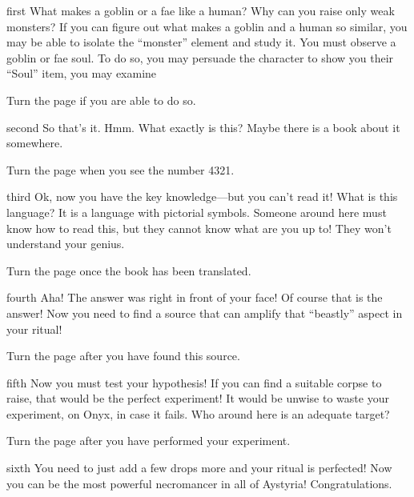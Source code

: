 \documentclass[notebook]{guildcamp2} %
\begin{document}
\startnotebook{\nraisemonster{}}

\begin{page}{first}
What makes a goblin or a fae like a human? Why can you raise only weak monsters? If you can figure out what makes a goblin and a human so similar, you may be able to isolate the ``monster'' element and study it. You must observe a goblin or fae soul. To do so, you may persuade the character to show you their ``Soul'' item, you may examine 

Turn the page if you are able to do so.
\end{page}

\begin{page}{second}
So that's it. Hmm. What exactly is this? Maybe there is a book about it somewhere. 

Turn the page when you see the number 4321.
\end{page}

\begin{page}{third}
Ok, now you have the key knowledge---but you can't read it! What is this language? It is a language with pictorial symbols. Someone around here must know how to read this, but they cannot know what are you up to! They won't understand your genius.

Turn the page once the book has been translated.
\end{page}

\begin{page}{fourth}
Aha! The answer was right in front of your face! Of course that is the answer! Now you need to find a source that can amplify that ``beastly'' aspect in your ritual!

Turn the page after you have found this source.
\end{page}

\begin{page}{fifth}
Now you must test your hypothesis! If you can find a suitable corpse to raise, that would be the perfect experiment! It would be unwise to waste your experiment, on Onyx, in case it fails. Who around here is an adequate target?

Turn the page after you have performed your experiment.
\end{page}

\begin{page}{sixth}
You need to just add a few drops more and your ritual is perfected! Now you can be the most powerful necromancer in all of Aystyria! Congratulations.
\end{page}

\endnotebook
\end{document}
